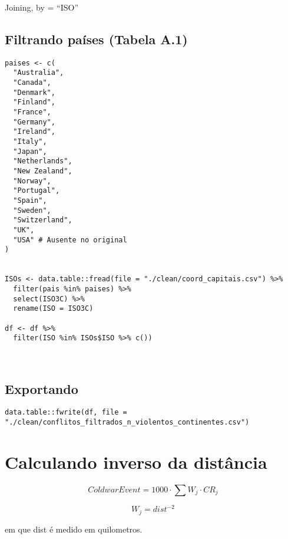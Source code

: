\documentclass[11pt]{article}
\begin{document}
Joining, by = ``ISO''

\subsection*{Filtrando países (Tabela A.1)}
\label{sec:orgb88821a}


\begin{verbatim}
paises <- c(
  "Australia",
  "Canada",
  "Denmark",
  "Finland",
  "France",
  "Germany",
  "Ireland",
  "Italy",
  "Japan",
  "Netherlands",
  "New Zealand",
  "Norway",
  "Portugal",
  "Spain",
  "Sweden",
  "Switzerland",
  "UK",
  "USA" # Ausente no original
)


ISOs <- data.table::fread(file = "./clean/coord_capitais.csv") %>%
  filter(pais %in% paises) %>%
  select(ISO3C) %>%
  rename(ISO = ISO3C)

df <- df %>%
  filter(ISO %in% ISOs$ISO %>% c())
    
    
\end{verbatim}




\subsection*{Exportando}
\label{sec:org8644a9c}

\begin{verbatim}
data.table::fwrite(df, file = "./clean/conflitos_filtrados_n_violentos_continentes.csv")
\end{verbatim}

\section*{Calculando inverso da distância}
\label{sec:org15a001d}



\begin{latex}
\begin{equation}
Cold war Event = 1000 \cdot \sum W_{j}\cdot CR_{j}
\end{equation}
\end{latex}

\begin{latex}
\begin{equation}
W_{j} = dist^{-2}
\end{equation}
\end{latex}

em que dist é medido em quilometros.
\end{document}
